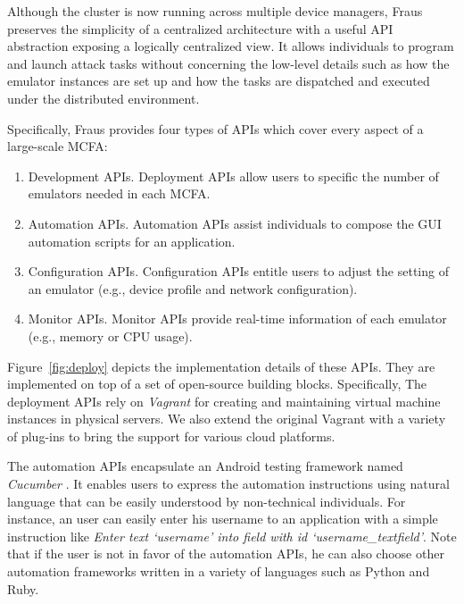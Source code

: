 \documentclass[conference]{IEEEtranl}
\begin{document}


	Although the cluster is now running across  multiple device managers, Fraus preserves the simplicity of a centralized architecture with a useful API abstraction exposing a logically centralized view. It allows individuals to program and launch attack tasks without concerning the low-level details such as how the emulator instances are set up and how the tasks are dispatched and executed under the distributed environment.

	Specifically, Fraus provides four types of APIs which cover every aspect of a large-scale MCFA:
	\begin{enumerate}
	\item{Development APIs.} Deployment APIs allow users to specific the number of emulators needed in each MCFA.
	\item{Automation APIs.} Automation APIs assist individuals to compose the GUI automation scripts for an application.
	\item{Configuration APIs.} Configuration APIs entitle users to adjust the setting of an emulator (e.g., device profile and network configuration).
	\item{Monitor APIs.} Monitor APIs provide real-time information of each emulator (e.g., memory or CPU usage).
	\end{enumerate}

	Figure~\ref{fig:deploy} depicts the implementation details of these APIs. They are implemented on top of a set of open-source building blocks. Specifically,
	The deployment APIs rely on \textit{Vagrant} \cite{hashimoto2013vagrant} for creating and maintaining virtual machine instances in physical servers. We also extend the original Vagrant with a variety of plug-ins to bring the support for various cloud platforms. 

	The automation APIs encapsulate an Android testing framework named \textit{Cucumber} \cite{kulkarni2016deployment}. It enables users to express the automation instructions using natural language that can be easily understood by non-technical individuals. For instance, an user can easily enter his username to an application with a simple instruction like \textit{Enter text `username' into field with id `username\_textfield'}. Note that if the user is not in favor of the automation APIs, he can also choose other automation frameworks written in a variety of languages such as Python and Ruby. 
\end{document}
